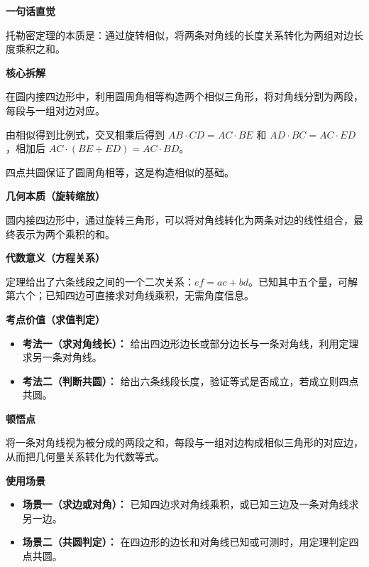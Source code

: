 \begin{explanationbox}
	\textbf{\textcolor{CExplanation}{一句话直觉}}

	托勒密定理的本质是：通过旋转相似，将两条对角线的长度关系转化为两组对边长度乘积之和。

	\medskip
	\textbf{\textcolor{CExplanation}{核心拆解}}
	\begin{description}[style=nextline, leftmargin=2.8em, labelsep=0.5em, itemsep=0.45em]
		\item[\textbf{要点一（旋转相似）：}] 在圆内接四边形中，利用圆周角相等构造两个相似三角形，将对角线分割为两段，每段与一组对边对应。
		\item[\textbf{要点二（乘积相加）：}] 由相似得到比例式，交叉相乘后得到 $AB\cdot CD = AC\cdot BE$ 和 $AD\cdot BC = AC\cdot ED$，相加后 $AC\cdot(BE+ED)=AC\cdot BD$。
		\item[\textbf{要点三（共圆前提）：}] 四点共圆保证了圆周角相等，这是构造相似的基础。
	\end{description}

	\medskip
	\textbf{\textcolor{CExplanation}{几何本质（旋转缩放）}}

	圆内接四边形中，通过旋转三角形，可以将对角线转化为两条对边的线性组合，最终表示为两个乘积的和。

	\medskip
	\textbf{\textcolor{CExplanation}{代数意义（方程关系）}}

	定理给出了六条线段之间的一个二次关系：$ef=ac+bd$。已知其中五个量，可解第六个；已知四边可直接求对角线乘积，无需角度信息。

	\medskip
	\textbf{\textcolor{CExplanation}{考点价值（求值判定）}}
	\begin{itemize}[leftmargin=*, itemsep=0.5em, topsep=0.4em]
		\item \textbf{考法一（求对角线长）：} 给出四边形边长或部分边长与一条对角线，利用定理求另一条对角线。
		\item \textbf{考法二（判断共圆）：} 给出六条线段长度，验证等式是否成立，若成立则四点共圆。
	\end{itemize}

	\medskip
	\textbf{\textcolor{CExplanation}{顿悟点}}

	将一条对角线视为被分成的两段之和，每段与一组对边构成相似三角形的对应边，从而把几何量关系转化为代数等式。

	\medskip
	\textbf{\textcolor{CExplanation}{使用场景}}
	\begin{itemize}[leftmargin=*, itemsep=0.5em, topsep=0.4em]
		\item \textbf{场景一（求边或对角）：} 已知四边求对角线乘积，或已知三边及一条对角线求另一边。
		\item \textbf{场景二（共圆判定）：} 在四边形的边长和对角线已知或可测时，用定理判定四点共圆。
	\end{itemize}
\end{explanationbox}
